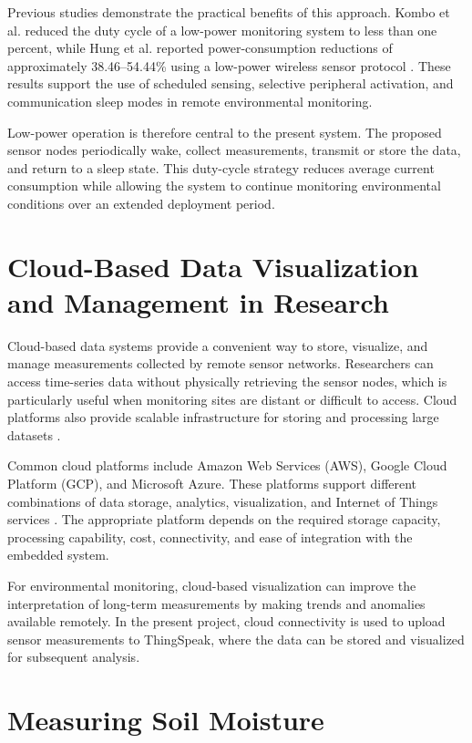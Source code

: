 Previous studies demonstrate the practical benefits of this approach.
Kombo et al. reduced the duty cycle of a low-power monitoring system to
less than one percent, while Hung et al. reported power-consumption
reductions of approximately 38.46--54.44\% using a low-power wireless
sensor protocol \cite{kombo2021groundwater,hung2020lowpower}. These results
support the use of scheduled sensing, selective peripheral activation, and
communication sleep modes in remote environmental monitoring.

Low-power operation is therefore central to the present system. The
proposed sensor nodes periodically wake, collect measurements, transmit or
store the data, and return to a sleep state. This duty-cycle strategy
reduces average current consumption while allowing the system to continue
monitoring environmental conditions over an extended deployment period.

\section{Cloud-Based Data Visualization and Management in Research}

Cloud-based data systems provide a convenient way to store, visualize, and
manage measurements collected by remote sensor networks. Researchers can
access time-series data without physically retrieving the sensor nodes,
which is particularly useful when monitoring sites are distant or difficult
to access. Cloud platforms also provide scalable infrastructure for storing
and processing large datasets \cite{naik2017cloud,sheffield2022cloud}.

Common cloud platforms include Amazon Web Services (AWS), Google Cloud
Platform (GCP), and Microsoft Azure. These platforms support different
combinations of data storage, analytics, visualization, and Internet of
Things services \cite{aws2023,gcp2023,azure2023}. The appropriate platform
depends on the required storage capacity, processing capability, cost,
connectivity, and ease of integration with the embedded system.

For environmental monitoring, cloud-based visualization can improve the
interpretation of long-term measurements by making trends and anomalies
available remotely. In the present project, cloud connectivity is used to
upload sensor measurements to ThingSpeak, where the data can be stored and
visualized for subsequent analysis.

\section{Measuring Soil Moisture}

